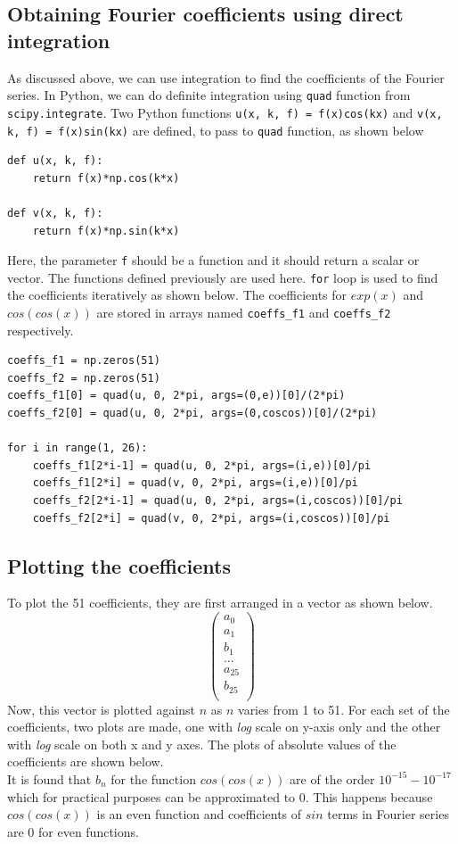 \documentclass[12pt, a4paper]{article}
\begin{document}
\subsection{Obtaining Fourier coefficients using direct integration}
	As discussed above, we can use integration to find the coefficients of the Fourier series. In Python, we can do definite integration using \texttt{quad} function from \texttt{scipy.integrate}. Two Python functions \texttt{u(x, k, f) = f(x)cos(kx)} and \texttt{v(x, k, f) = f(x)sin(kx)} are defined, to pass to \texttt{quad} function, as shown below
\begin{lstlisting}
def u(x, k, f):
    return f(x)*np.cos(k*x)

def v(x, k, f):
    return f(x)*np.sin(k*x)
\end{lstlisting}
	Here, the parameter \texttt{f} should be a function and it should return a scalar or vector. The functions defined previously are used here. \texttt{for} loop is used to find the coefficients iteratively as shown below. The coefficients for $exp(x)$ and $cos(cos(x))$ are stored in arrays named \texttt{coeffs\_f1} and \texttt{coeffs\_f2} respectively.
\begin{lstlisting}
coeffs_f1 = np.zeros(51)
coeffs_f2 = np.zeros(51)
coeffs_f1[0] = quad(u, 0, 2*pi, args=(0,e))[0]/(2*pi)
coeffs_f2[0] = quad(u, 0, 2*pi, args=(0,coscos))[0]/(2*pi)

for i in range(1, 26):
    coeffs_f1[2*i-1] = quad(u, 0, 2*pi, args=(i,e))[0]/pi
    coeffs_f1[2*i] = quad(v, 0, 2*pi, args=(i,e))[0]/pi
    coeffs_f2[2*i-1] = quad(u, 0, 2*pi, args=(i,coscos))[0]/pi
    coeffs_f2[2*i] = quad(v, 0, 2*pi, args=(i,coscos))[0]/pi
\end{lstlisting}
 
\subsection{Plotting the coefficients}
To plot the 51 coefficients, they are first arranged in a vector as shown below.
$$\begin{pmatrix}
	a_0 \\
	a_1 \\
	b_1 \\
	... \\
	a_{25} \\
	b_{25} \\
\end{pmatrix}$$ 
Now, this vector is plotted against $n$ as $n$ varies from 1 to 51. For each set of the coefficients, two plots are made, one with \textit{log} scale on y-axis only and the other with \textit{log} scale on both x and y axes. The plots of absolute values of the coefficients are shown below.\\ 
It is found that $b_n$ for the function $cos(cos(x))$ are of the order $10^{-15}-10^{-17}$ which for practical purposes can be approximated to $0$.  This happens because $cos(cos(x))$ is an even function and coefficients of $sin$ terms in Fourier series are 0 for even functions.
\end{document}
